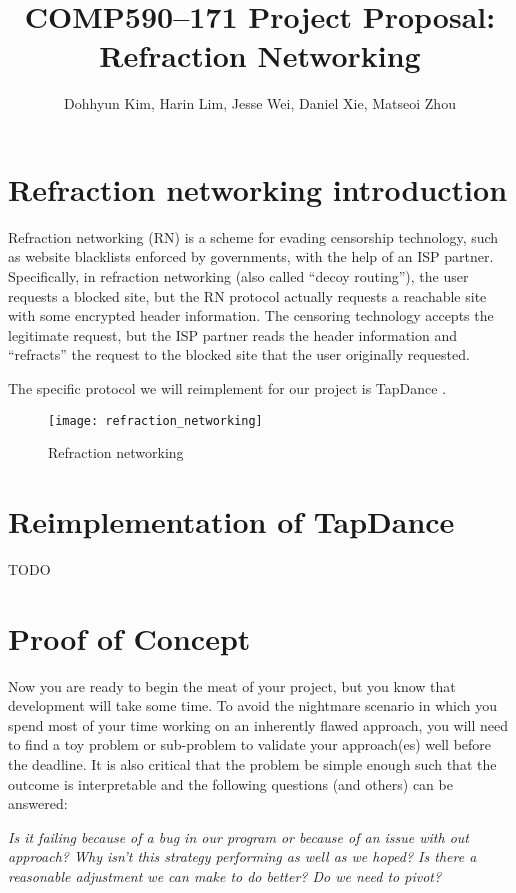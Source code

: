 \documentclass{article}
\title{COMP590--171 Project Proposal: Refraction Networking}
\author{Dohhyun Kim, Harin Lim, Jesse Wei, Daniel Xie, Matseoi Zhou}
\begin{document}
\maketitle

\section{Refraction networking introduction}

Refraction networking (RN) is a scheme for evading censorship technology, such as website blacklists enforced by governments, with the help of an ISP partner. Specifically, in refraction networking (also called ``decoy routing''), the user requests a blocked site, but the RN protocol actually requests a reachable site with some encrypted header information. The censoring technology accepts the legitimate request, but the ISP partner reads the header information and ``refracts'' the request to the blocked site that the user originally requested.

The specific protocol we will reimplement for our project is TapDance \cite{tapdance}.

\begin{figure}[h]
    \centering
    \texttt{[image: refraction\_networking]}
    \caption{Refraction networking \cite{refraction_network}}
\end{figure}

\section{Reimplementation of TapDance}

TODO

\section{Proof of Concept}
Now you are ready to begin the meat of your project, but you know that development will take some time. To avoid the nightmare scenario in which you spend most of your time working on an inherently flawed approach, you will need to find a toy problem or sub-problem to validate your approach(es) well before the deadline. It is also critical that the problem be simple enough such that the outcome is interpretable and the following questions (and others) can be answered:

\textit{Is it failing because of a bug in our program or because of an issue with out approach? Why isn't this strategy performing as well as we hoped? Is there a reasonable adjustment we can make to do better? Do we need to pivot?}
\end{document}
